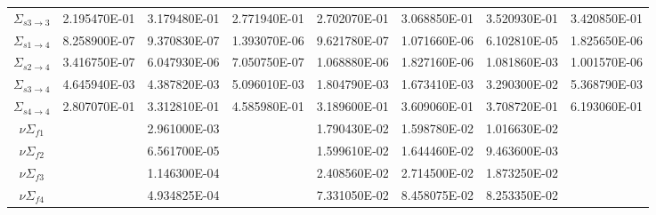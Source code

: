 \begin{landscape}
\begin{table}
\begin{center}
\begin{tabular}{cccccccc}
          $\Sigma_{s 3\rightarrow 3}$&2.195470E-01&3.179480E-01&2.771940E-01&2.702070E-01&3.068850E-01&3.520930E-01&3.420850E-01\\
          $\Sigma_{s 1\rightarrow 4}$&8.258900E-07&9.370830E-07&1.393070E-06&9.621780E-07&1.071660E-06&6.102810E-05&1.825650E-06\\
          $\Sigma_{s 2\rightarrow 4}$&3.416750E-07&6.047930E-06&7.050750E-07&1.068880E-06&1.827160E-06&1.081860E-03&1.001570E-06\\
          $\Sigma_{s 3\rightarrow 4}$&4.645940E-03&4.387820E-03&5.096010E-03&1.804790E-03&1.673410E-03&3.290300E-02&5.368790E-03\\
          $\Sigma_{s 4\rightarrow 4}$&2.807070E-01&3.312810E-01&4.585980E-01&3.189600E-01&3.609060E-01&3.708720E-01&6.193060E-01\\
          $ \nu \Sigma_{f1}$&&2.961000E-03&&1.790430E-02&1.598780E-02&1.016630E-02&\\
          $ \nu \Sigma_{f2}$&&6.561700E-05&&1.599610E-02&1.644460E-02&9.463600E-03&\\
          $ \nu \Sigma_{f3}$&&1.146300E-04&&2.408560E-02&2.714500E-02&1.873250E-02&\\
          $ \nu \Sigma_{f4}$&&4.934825E-04&&7.331050E-02&8.458075E-02&8.253350E-02&\\
          \bottomrule
        \end{tabular}
      \end{center}
    \end{table}
    \end{landscape}
    \restoregeometry
    \pagestyle{plain}

